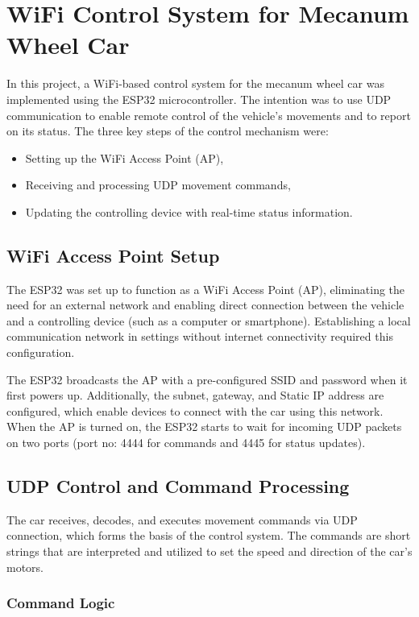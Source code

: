 \documentclass[a4paper,12pt]{article}
\begin{document}
\section{WiFi Control System for Mecanum Wheel Car}

In this project, a WiFi-based control system for the mecanum wheel car was implemented using the ESP32 microcontroller. The intention was to use UDP communication to enable remote control of the vehicle's movements and to report on its status. The three key steps of the control mechanism were:
\begin{itemize}
    \item Setting up the WiFi Access Point (AP),
    \item Receiving and processing UDP movement commands,
    \item Updating the controlling device with real-time status information.
\end{itemize}

\subsection{WiFi Access Point Setup}

The ESP32 was set up to function as a WiFi Access Point (AP), eliminating the need for an external network and enabling direct connection between the vehicle and a controlling device (such as a computer or smartphone). Establishing a local communication network in settings without internet connectivity required this configuration.

The ESP32 broadcasts the AP with a pre-configured SSID and password when it first powers up. Additionally, the subnet, gateway, and Static IP address are configured, which enable devices to connect with the car using this network. When the AP is turned on, the ESP32 starts to wait for incoming UDP packets on two ports (port no: 4444 for commands and 4445 for status updates).

\subsection{UDP Control and Command Processing}

The car receives, decodes, and executes movement commands via UDP connection, which forms the basis of the control system. The commands are short strings that are interpreted and utilized to set the speed and direction of the car's motors.

\subsubsection{Command Logic}
\end{document}
